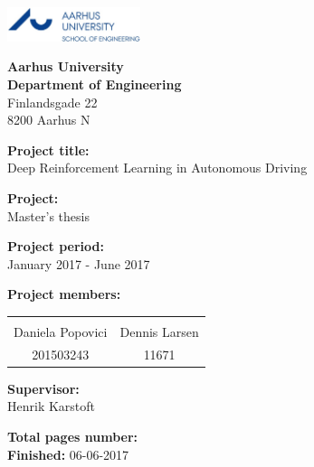 \newpage
\mbox{}
\thispagestyle{empty}
\newpage


{}

\begin{minipage}[t]{0.48\textwidth}
	\vspace*{14pt}			%
	\vspace{1.2cm}
	\includegraphics[height=1cm]{Figures/au_ingenioerhoejskolen_en_logo.jpg} 
\end{minipage}
\hfill

\vspace*{1cm}

\begin{minipage}[t]{1\textwidth}
	
	{\small 
		\flushleft
		\textbf{Aarhus University}\\
		\textbf{Department of Engineering}  \\
		Finlandsgade 22 \\
		8200 Aarhus N \\
	}
	
	\vspace*{1cm}
	
	\textbf{Project title:} \\[5pt]\bigskip\hspace{2ex}
	Deep Reinforcement Learning in Autonomous Driving
	
	\textbf{Project:} \\[5pt]\bigskip\hspace{2ex}
	Master's thesis
	
	\textbf{Project period:} \\[5pt]\bigskip\hspace{2ex}
	January 2017 - June 2017
	
	\textbf{Project members:} \\[5pt]\hspace*{2ex}
	\begin{table}[H]
		\begin{tabular}{c c}
			\underline{\phantom{mmmmmmmmmmmmmmmm}} & \underline{\phantom{mmmmmmmmmmmmmmmm}}  
			\\
			Daniela Popovici		& Dennis Larsen	
			\\
			201503243				& 11671												
		\end{tabular}
	\end{table}
	
	\textbf{Supervisor:} \\[5pt]\hspace*{2ex}
	Henrik Karstoft \\\hspace*{2ex}
	
	\textbf{Total pages number:} \pageref{LastPage} \\
	\textbf{Finished:} 06-06-2017
	\hfill
	\vfill
\end{minipage}

